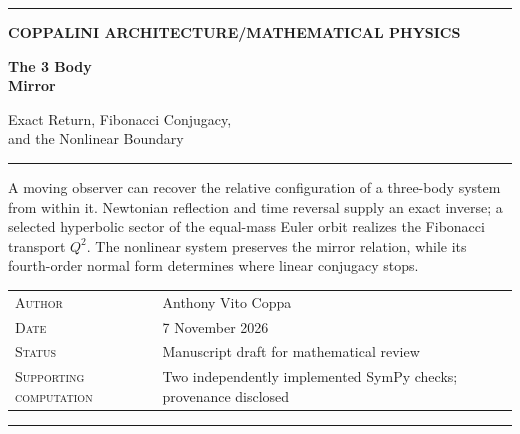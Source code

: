 \documentclass[11pt,letterpaper]{article}
\theoremstyle{paper}
\begin{document}
\hypersetup{pageanchor=false}
\begin{titlepage}
\thispagestyle{empty}
\vspace*{0.42in}
{\color{tealblue}\rule{\textwidth}{1.45pt}}\par
\vspace{0.38in}
{\sffamily\footnotesize\bfseries\color{tealblue} COPPALINI ARCHITECTURE\enspace/\enspace MATHEMATICAL PHYSICS}\par
\vspace{0.29in}
{\fontsize{33}{37}\selectfont\bfseries\color{ink}The 3 Body\\[0.06em]Mirror\par}
\vspace{0.19in}
{\Large\color{tealblue}Exact Return, Fibonacci Conjugacy,\\[0.13em]and the Nonlinear Boundary\par}
\vspace{0.24in}
{\color{lightline}\rule{\textwidth}{0.6pt}}
\vspace{0.30in}
\begin{minipage}{0.97\textwidth}
\large\color{ink}
A moving observer can recover the relative configuration of a three-body system from within it. Newtonian reflection and time reversal supply an exact inverse; a selected hyperbolic sector of the equal-mass Euler orbit realizes the Fibonacci transport $Q^2$. The nonlinear system preserves the mirror relation, while its fourth-order normal form determines where linear conjugacy stops.
\end{minipage}
\vfill
\begin{center}
\end{center}
\vfill
\begin{tabularx}{\textwidth}{@{}lX@{}}
\textsc{Author} & Anthony Vito Coppa \\
\textsc{Date} & 7 November 2026 \\
\textsc{Status} & Manuscript draft for mathematical review \\
\textsc{Supporting computation} & Two independently implemented SymPy checks; provenance disclosed
\end{tabularx}
\vspace{0.31in}
{\color{tealblue}\rule{\textwidth}{1.45pt}}
\end{titlepage}
\end{document}
